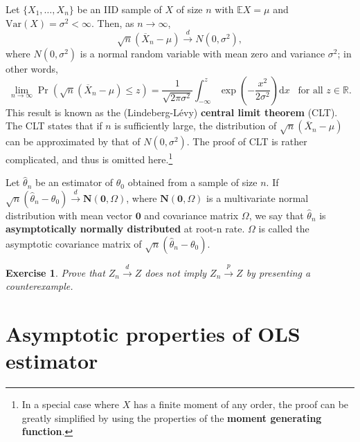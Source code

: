 \documentclass[10.5pt, A4paper, openany, uplatex]{book}
\newcommand{\mbf}{\mathbf}
\newcommand{\mrm}{\mathrm}
\newcommand{\E}{\mathbb{E}}
\newcommand{\Var}{\mathrm{Var}}
\renewcommand{\hat}{\widehat}
\renewcommand{\bar}{\overline}
\newtheorem{exercise}[theorem]{Exercise}
\numberwithin{equation}{section}
\begin{document}
Let $\{ X_1,\ldots,X_n \}$ be an IID sample of $X$ of size $n$ with $\E X = \mu$ and $\Var(X) = \sigma^2 < \infty$.
Then, as $n \to \infty$,
\[	
\sqrt{n}(\bar X_n - \mu) \overset{d}{\to} N(0,\sigma^2),
\]
where $N(0, \sigma^2)$ is a normal random variable with mean zero and variance $\sigma^2$; in other words,
\[
\lim_{n \to \infty}\Pr\left( \sqrt{n}(\bar X_n - \mu) \le z \right) = \frac{1}{\sqrt{2 \pi \sigma^2}}\int_{-\infty}^z \exp\left(-\frac{x^2}{2\sigma^2} \right) \mrm{d}x \;\;\; \text{for all $z\in\mathbb{R}$.}
\]
This result is known as the (Lindeberg-L\'{e}vy) \textbf{central limit theorem} (CLT).
The CLT states that if $n$ is sufficiently large, the distribution of $\sqrt{n}(\bar X_n - \mu)$ can be approximated by that of $N(0,\sigma^2)$.
The proof of CLT is rather complicated, and thus is omitted here.\footnote{
	In a special case where $X$ has a finite moment of any order, the proof can be greatly simplified by using the properties of the \textbf{moment generating function}.
}
\bigskip

Let $\hat\theta_n$ be an estimator of $\theta_0$ obtained from a sample of size $n$.
If $\sqrt{n}(\hat\theta_n - \theta_0) \overset{d}{\to} \mbf{N}(\mbf{0},\Omega)$, where $\mbf{N}(\mbf{0}, \Omega)$ is a multivariate normal distribution with mean vector $\mbf{0}$ and covariance matrix $\Omega$, we say that $\hat\theta_n$ is \textbf{asymptotically normally distributed} at root-n rate.
$\Omega$ is called the asymptotic covariance matrix of $\sqrt{n}(\hat\theta_n - \theta_0)$.

\begin{framed}
\begin{exercise}\upshape
	Prove that $Z_n \overset{d}{\to} Z$ does not imply $Z_n \overset{p}{\to} Z$ by presenting a counterexample.
\end{exercise}

\end{framed}

\section{Asymptotic properties of OLS estimator}\label{sec:OLSasymp}
\end{document}
